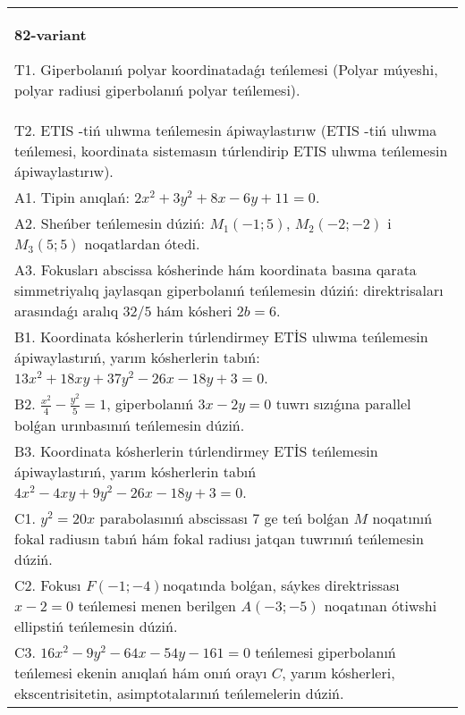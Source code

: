 \documentclass{article}
\begin{document}
\begin{tabular}{m{17cm}}
\textbf{82-variant}
\newline

T1. Giperbolanıń polyar koordinatadaǵı teńlemesi (Polyar múyeshi, polyar radiusi giperbolanıń polyar teńlemesi).\\

T2. ETIS -tiń ulıwma teńlemesin ápiwaylastırıw (ETIS -tiń ulıwma teńlemesi, koordinata sistemasın túrlendirip ETIS ulıwma teńlemesin ápiwaylastırıw).\\

A1. Tipin anıqlań: $2 x^{2}+3 y^{2}+8 x-6 y+11=0$.\\

A2. Sheńber teńlemesin dúziń: $M_1 (-1;5) $, $M_2 (-2;-2) $ i $M_3 (5;5) $ noqatlardan ótedi.\\

A3. Fokusları abscissa kósherinde hám koordinata basına qarata simmetriyalıq jaylasqan giperbolanıń teńlemesin dúziń: direktrisaları arasındaǵı aralıq $32/5$ hám kósheri $2 b=6$.\\

B1. Koordinata kósherlerin túrlendirmey ETİS ulıwma teńlemesin ápiwaylastırıń, yarım kósherlerin tabıń: $13x^{2} + 18xy + 37y^{2} - 26x - 18y + 3 = 0$.  \\

B2. $\frac{x^{2}}{4} - \frac{y^{2}}{5} = 1$, giperbolanıń $3x - 2y = 0$ tuwrı sızıǵına parallel bolǵan urınbasınıń teńlemesin dúziń.  \\

B3. Koordinata kósherlerin túrlendirmey ETİS teńlemesin ápiwaylastırıń, yarım kósherlerin tabıń $4x^{2} - 4xy + 9y^{2} - 26x - 18y + 3 = 0$.\\

C1. $y^{2} = 20x$ parabolasınıń abscissası 7 ge teń bolǵan $M$ noqatınıń fokal radiusın tabıń hám fokal radiusı jatqan tuwrınıń teńlemesin dúziń.  \\

C2. Fokusı $F( - 1; - 4)$noqatında bolǵan, sáykes direktrissası $x - 2 = 0$ teńlemesi menen berilgen $A( - 3; - 5)$ noqatınan ótiwshi ellipstiń teńlemesin dúziń.  \\

C3. $16x^{2} - 9y^{2} - 64x - 54y - 161 = 0$ teńlemesi giperbolanıń teńlemesi ekenin anıqlań hám onıń orayı $C$, yarım kósherleri, ekscentrisitetin, asimptotalarınıń teńlemelerin dúziń.  \\

\end{tabular}
\vspace{1cm}
\end{document}
